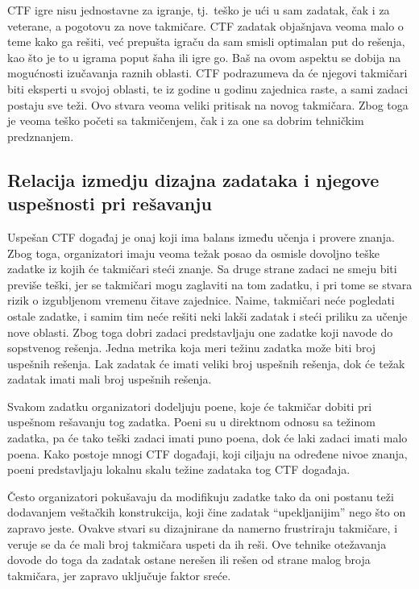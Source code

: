 \documentclass[12pt, a4paper, twocolumn]{article}
\begin{document}
CTF igre nisu jednostavne za igranje, tj.\ teško je ući u sam zadatak, čak i
za veterane, a pogotovu za nove takmičare. CTF zadatak objašnjava veoma
malo o teme kako ga rešiti, već prepušta igraču da sam smisli optimalan put
do rešenja, kao što je to u igrama poput šaha ili igre go. Baš na ovom aspektu
se dobija na mogućnosti izučavanja raznih oblasti. CTF podrazumeva da će
njegovi takmičari biti eksperti u svojoj oblasti, te iz godine u godinu
zajednica raste, a sami zadaci postaju sve teži. Ovo stvara veoma veliki 
pritisak na novog takmičara. Zbog toga je veoma teško početi sa takmičenjem,
čak i za one sa dobrim tehničkim predznanjem.

\subsection{
    Relacija izmedju dizajna zadataka i njegove uspešnosti pri rešavanju
}

Uspešan CTF događaj je onaj koji ima balans između učenja i provere znanja.
Zbog toga, organizatori imaju veoma težak posao da osmisle dovoljno teške 
zadatke iz kojih će takmičari steći znanje. Sa druge strane zadaci ne
smeju biti previše teški, jer se takmičari mogu zaglaviti na tom zadatku, i
pri tome se stvara rizik o izgubljenom vremenu čitave zajednice. Naime,
takmičari neće pogledati ostale zadatke, i samim tim neće rešiti neki lakši 
zadatak i steći priliku za učenje nove oblasti. Zbog toga dobri zadaci 
predstavljaju one zadatke koji navode do sopstvenog rešenja. Jedna metrika 
koja meri težinu zadatka može biti broj uspešnih rešenja. Lak zadatak će imati 
veliki broj uspešnih rešenja, dok će težak zadatak imati mali broj uspešnih 
rešenja.

Svakom zadatku organizatori dodeljuju poene, koje će takmičar dobiti pri
uspešnom rešavanju tog zadatka. Poeni su u direktnom odnosu sa težinom 
zadatka, pa će tako teški zadaci imati puno poena, dok će laki zadaci imati 
malo poena. Kako postoje mnogi CTF događaji, koji ciljaju na određene nivoe 
znanja, poeni predstavljaju lokalnu skalu težine zadataka tog CTF događaja.

Često organizatori pokušavaju da modifikuju zadatke tako da oni postanu teži
dodavanjem veštačkih konstrukcija, koji čine zadatak ``upekljanijim'' nego
što on zapravo jeste. Ovakve stvari su dizajnirane da namerno frustriraju
takmičare, i veruje se da će mali broj takmičara uspeti da ih reši.
Ove tehnike otežavanja dovode do toga da zadatak ostane nerešen ili rešen
od strane malog broja takmičara, jer zapravo uključuje faktor sreće. 
\end{document}
